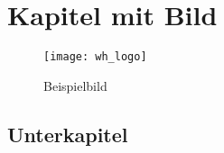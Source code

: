 \chapter{Kapitel mit Bild}

\begin{figure} [ht]
        \begin{center}
        \texttt{[image: wh\_logo]}
        \caption{Beispielbild}
        \label{fig:ER-Diagramm}
        \end{center}
\end{figure}

\section{Unterkapitel}
